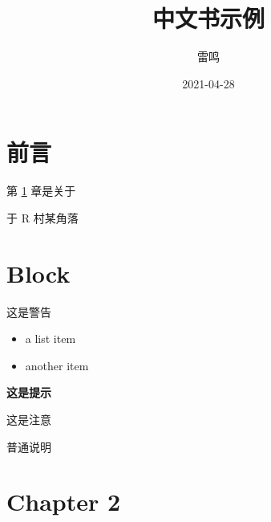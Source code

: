 \documentclass[]{ctexbook}
\title{中文书示例}
\author{雷鸣}
\date{2021-04-28}
\providecommand{\tightlist}{%
  \setlength{\itemsep}{0pt}\setlength{\parskip}{0pt}}
\begin{document}
\maketitle

{
\setcounter{tocdepth}{2}
\tableofcontents
}
\hypertarget{ux524dux8a00}{%
\chapter*{前言}\label{ux524dux8a00}}


第 \ref{chapter1} 章是关于

\begin{flushright}
于 R 村某角落
\end{flushright}

\mainmatter

\hypertarget{chapter1}{%
\chapter{Block}\label{chapter1}}

\citet{blei2017variational}

\begin{rmdwarn}
这是警告

\begin{itemize}
\tightlist
\item
  a list item
\item
  another item
\end{itemize}
\end{rmdwarn}

\begin{rmdtip}
\textbf{这是提示}
\end{rmdtip}

\begin{rmdnote}
这是注意
\end{rmdnote}

\begin{rmdinfo}
普通说明
\end{rmdinfo}

\hypertarget{chapter2}{%
\chapter{Chapter 2}\label{chapter2}}

\citep{kingma2013auto}



\backmatter
\printindex
\end{document}
